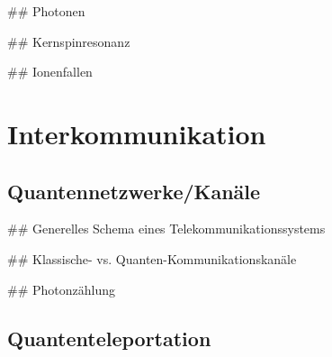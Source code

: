 ## Photonen

## Kernspinresonanz

## Ionenfallen


\section{Interkommunikation}
\label{sec:Interkommunikation}


\subsection{Quantennetzwerke/Kan\"ale}
\label{sec:Quantennetzwerke/Kanale}

## Generelles Schema eines Telekommunikationssystems

## Klassische- vs. Quanten-Kommunikationskan\"ale

## Photonz\"ahlung


\subsection{Quantenteleportation}
\label{sec:Quantenteleportation}






